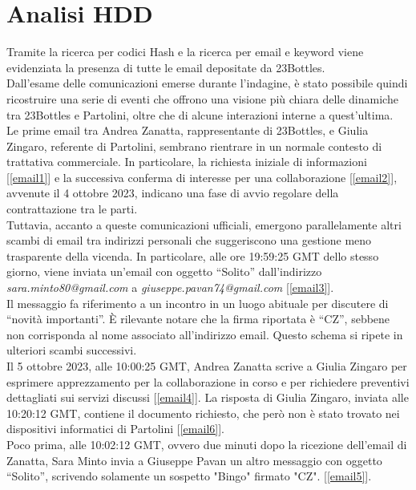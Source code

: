 \section{Analisi HDD}
Tramite la ricerca per codici Hash e la ricerca per email e keyword viene evidenziata la presenza di tutte le email depositate da 23Bottles.\vspace{14pt}\\
Dall’esame delle comunicazioni emerse durante l’indagine, è stato possibile quindi ricostruire una serie di eventi che offrono una visione più chiara delle dinamiche tra 23Bottles e Partolini, oltre che di alcune interazioni interne a quest’ultima.\vspace{14pt}\\
Le prime email tra Andrea Zanatta, rappresentante di 23Bottles, e Giulia Zingaro, referente di Partolini, sembrano rientrare in un normale contesto di trattativa commerciale. In particolare, la richiesta iniziale di informazioni [\ref{email1}] e la successiva conferma di interesse per una collaborazione [\ref{email2}], avvenute il 4 ottobre 2023, indicano una fase di avvio regolare della contrattazione tra le parti.\\
Tuttavia, accanto a queste comunicazioni ufficiali, emergono parallelamente altri scambi di email tra indirizzi personali che suggeriscono una gestione meno trasparente della vicenda.
In particolare, alle ore 19:59:25 GMT dello stesso giorno, viene inviata un’email con oggetto “Solito” dall’indirizzo \textit{sara.minto80@gmail.com} a \textit{giuseppe.pavan74@gmail.com} [\ref{email3}].\\
Il messaggio fa riferimento a un incontro in un luogo abituale per discutere di “novità importanti”. È rilevante notare che la firma riportata è “CZ”, sebbene non corrisponda al nome associato all’indirizzo email. Questo schema si ripete in ulteriori scambi successivi.\vspace{14pt}\\
Il 5 ottobre 2023, alle 10:00:25 GMT, Andrea Zanatta scrive a Giulia Zingaro per esprimere apprezzamento per la collaborazione in corso e per richiedere preventivi dettagliati sui servizi discussi [\ref{email4}]. La risposta di Giulia Zingaro, inviata alle 10:20:12 GMT, contiene il documento richiesto, che però non è stato trovato nei dispositivi informatici di Partolini [\ref{email6}].\\
Poco prima, alle 10:02:12 GMT, ovvero due minuti dopo la ricezione dell’email di Zanatta, Sara Minto invia a Giuseppe Pavan un altro messaggio con oggetto “Solito”, scrivendo solamente un sospetto "Bingo" firmato "CZ". [\ref{email5}].\vspace{14pt}\\
